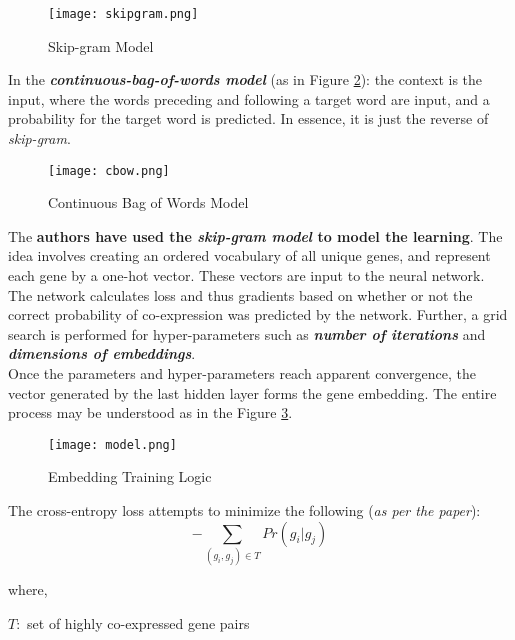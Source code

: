     \begin{figure}
        \centering
        \texttt{[image: skipgram.png]}
        \caption{Skip-gram Model}
        \label{fig:skipgram}
    \end{figure}

    In the \textbf{\textit{continuous-bag-of-words model}} (as in Figure \ref{fig:cbow}): the context is the input, where the words preceding and following a target word are input, and a probability for the target word is predicted. In essence, it is just the reverse of \textit{skip-gram}.\\

    \begin{figure}
        \centering
        \texttt{[image: cbow.png]}
        \caption{Continuous Bag of Words Model}
        \label{fig:cbow}
    \end{figure}

    The \textbf{authors have used the \textit{skip-gram model} to model the learning}. The idea involves creating an ordered vocabulary of all unique genes, and represent each gene by a one-hot vector. These vectors are input to the neural network. The network calculates loss and thus gradients based on whether or not the correct probability of co-expression was predicted by the network. Further, a grid search is performed for hyper-parameters such as \textbf{\textit{number of iterations}} and \textbf{\textit{dimensions of embeddings}}.\\

    Once the parameters and hyper-parameters reach apparent convergence, the vector generated by the last hidden layer forms the gene embedding. The entire process may be understood as in the Figure \ref{fig:model}.

    \begin{figure}
        \centering
        \texttt{[image: model.png]}
        \caption{Embedding Training Logic}
        \label{fig:model}
    \end{figure}


    The cross-entropy loss attempts to minimize the following (\textit{as per the paper}):
    \begin{equation}
        -\sum_{(g_i, g_j)\in \mathit{T}} \mathit{Pr}(g_i | g_j)
    \end{equation}

    where,

    $\mathit{T:}$ set of highly co-expressed gene pairs

